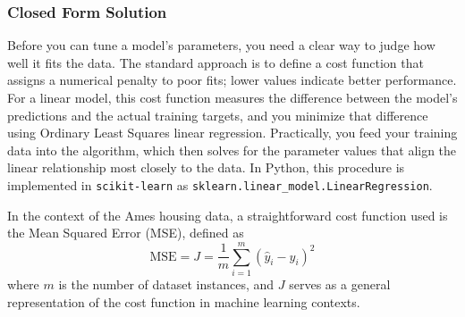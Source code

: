 \documentclass[12pt,letter]{article}
\begin{document}
\subsubsection{Closed Form Solution}

Before you can tune a model's parameters, you need a clear way to judge how well it fits the data. The standard approach is to define a cost function that assigns a numerical penalty to poor fits; lower values indicate better performance. For a linear model, this cost function measures the difference between the model's predictions and the actual training targets, and you minimize that difference using Ordinary Least Squares linear regression. Practically, you feed your training data into the algorithm, which then solves for the parameter values that align the linear relationship most closely to the data. In Python, this procedure is implemented in \texttt{scikit-learn} as \texttt{sklearn.linear\_model.LinearRegression}.

%

In the context of the Ames housing data, a straightforward cost function used is the Mean Squared Error (MSE), defined as
\begin{equation}
\text{MSE} = J = \frac{1}{m} \sum_{i=1}^{m} (\hat{y}_i-y_i)^2
\end{equation}
\noindent where $m$ is the number of dataset instances, and $J$ serves as a general representation of the cost function in machine learning contexts.
\end{document}
